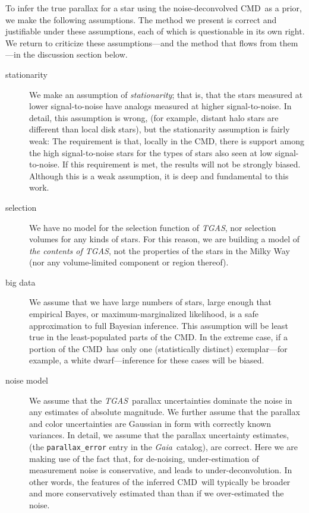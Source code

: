 \documentclass[modern]{aastex61}
\newcommand{\acronym}[1]{{\small{#1}}}
\newcommand{\project}[1]{\textsl{#1}}
\newcommand{\tgas}{\project{\acronym{TGAS}}}
\newcommand{\gaia}{\project{Gaia}}
\newcommand{\cmd}{\acronym{CMD}}
\begin{document}
To infer the true parallax for a star using the noise-deconvolved \cmd\ as
a prior, we make the following assumptions. The method we present is correct
and justifiable under these assumptions, each of which is questionable
in its own right. We return to criticize these assumptions---and the
method that flows from them---in the discussion section below.
\begin{description}
\item[stationarity] We make an assumption of \emph{stationarity}; that is, that the
  stars measured at lower signal-to-noise have analogs measured at
  higher signal-to-noise.
  In detail, this assumption is wrong, (for example, distant halo stars are different than local
  disk stars), but the stationarity assumption is fairly weak:
  The requirement is that, locally in the \cmd, there is
  support among the high signal-to-noise stars for the types
  of stars also seen at low signal-to-noise.
  If this requirement is met, the results will not be
  strongly biased. Although this is a weak assumption, it is deep and fundamental to this
  work.
\item[selection] We have no model for the selection function of \tgas,
  nor selection volumes for any kinds of stars.
  For this reason, we are building a model of \emph{the contents of \tgas}, not the
  properties of the stars in the Milky Way (nor any volume-limited component or region
  thereof).
\item[big data] We assume that we have large numbers of stars, large enough that
  empirical Bayes, or maximum-marginalized likelihood, is a safe
  approximation to full Bayesian inference. This assumption will be
  least true in the least-populated parts of the \cmd. In the extreme
  case, if a portion of the \cmd\ has only one (statistically distinct)
  exemplar---for example, a white dwarf---inference for these cases will be biased.
\item[noise model] We assume that the \tgas\ parallax uncertainties dominate the
  noise in any estimates of absolute magnitude. We further assume that
  the parallax and color uncertainties are Gaussian in form with
  correctly known variances. In detail, we assume that the parallax uncertainty estimates,
  (the \texttt{parallax{\_}error} entry in the \gaia\ catalog), are correct.
  Here we are making use of the fact that, for
  de-noising, under-estimation of measurement noise is conservative, and leads to under-deconvolution. In other words, the features of the inferred \cmd\ will typically be broader and more conservatively estimated than than if we over-estimated the noise.

\end{description}
\end{document}
